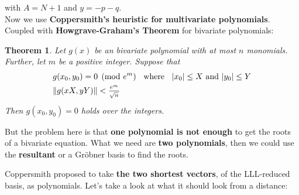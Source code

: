 \documentclass[a4paper,11pt]{article}
\newtheorem{theorem}{Theorem}
\begin{document}
with $A = N + 1$ and $y = -p -q$.\\

Now we use \textbf{Coppersmith's heuristic for multivariate polynomials}. Coupled with \textbf{Howgrave-Graham's Theorem} for bivariate polynomials:

\begin{theorem}
Let $g(x)$ be an bivariate polynomial with at most $n$ monomials. Further, let $m$ be a positive integer. Suppose that
\setcounter{equation}{0}
\begin{align}
&g(x_0,y_0) = 0 \pmod{e^m} \hspace{2mm} \text{ where } \hspace{2mm} |x_0| \leq X \text{ and } |y_0| \leq Y\\
&\|g(xX,yY)\| < \frac{_{e^m}}{^{\sqrt{n}}}
\end{align}
Then $g(x_0,y_0)=0$ holds over the integers.\\
\end{theorem}

But the problem here is that \textbf{one polynomial is not enough} to get the roots of a bivariate equation. What we need are \textbf{two polynomials}, then we could use the \textbf{resultant} or a Gröbner basis to find the roots.

Coppersmith proposed to take \textbf{the two shortest vectors}, of the LLL-reduced basis, as polynomials. Let's take a look at what it should look from a distance:\\
\end{document}
